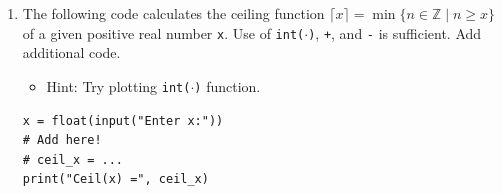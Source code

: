 \documentclass[../main.tex]{subfiles}
\begin{document}
\begin{enumerate}
\item The following code calculates the ceiling function $\lceil x \rceil = \min \{n \in \mathbb{Z} \mid n \geq x\}$ of a given positive real number \texttt{x}.
Use of \texttt{int($\cdot$)}, \texttt{+}, and \texttt{-} is sufficient.
Add additional code.
\begin{itemize}
\item Hint: Try plotting \texttt{int($\cdot$)} function.
\end{itemize}
\begin{verbatim}
x = float(input("Enter x:"))
# Add here!
# ceil_x = ...
print("Ceil(x) =", ceil_x)
\end{verbatim}
\end{enumerate}
\end{document}
